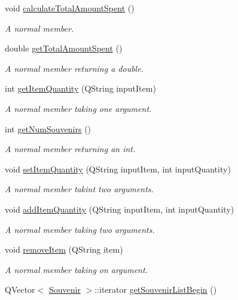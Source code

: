 \begin{DoxyCompactItemize}
void \hyperlink{class_campus_a3e29b9f63fb6a66ed5a2c6a1fe0a7efd}{calculate\+Total\+Amount\+Spent} ()
\begin{DoxyCompactList}\small\item\em A normal member. \end{DoxyCompactList}\item 
double \hyperlink{class_campus_a87c0b0ac49c8afb595300a6cf02d2209}{get\+Total\+Amount\+Spent} ()
\begin{DoxyCompactList}\small\item\em A normal member returning a double. \end{DoxyCompactList}\item 
int \hyperlink{class_campus_a7d10a879ce94effb031a02ef58261902}{get\+Item\+Quantity} (Q\+String input\+Item)
\begin{DoxyCompactList}\small\item\em A normal member taking one argument. \end{DoxyCompactList}\item 
int \hyperlink{class_campus_a082abcb4a749dc02f6202eb5978219f0}{get\+Num\+Souvenirs} ()
\begin{DoxyCompactList}\small\item\em A normal member returning an int. \end{DoxyCompactList}\item 
void \hyperlink{class_campus_a9df6d860dce913b125409f5ecf2b61cf}{set\+Item\+Quantity} (Q\+String input\+Item, int input\+Quantity)
\begin{DoxyCompactList}\small\item\em A normal member takint two arguments. \end{DoxyCompactList}\item 
void \hyperlink{class_campus_afc08eb098c08a751e60b5b643c2d0e81}{add\+Item\+Quantity} (Q\+String input\+Item, int input\+Quantity)
\begin{DoxyCompactList}\small\item\em A normal member taking two arguments. \end{DoxyCompactList}\item 
void \hyperlink{class_campus_ae95241376c7252193d7960b22572e211}{remove\+Item} (Q\+String item)
\begin{DoxyCompactList}\small\item\em A normal member taking on argument. \end{DoxyCompactList}\item 
Q\+Vector$<$ \hyperlink{class_souvenir}{Souvenir} $>$\+::iterator \hyperlink{class_campus_a88b7dc84bb8754c76ec1579e0a075293}{get\+Souvenir\+List\+Begin} ()

\end{DoxyCompactItemize}

